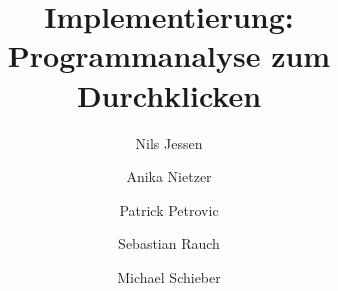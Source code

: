 \documentclass[parskip=full,11pt]{scrartcl}
\begin{document}
	\title{Implementierung: Programmanalyse zum Durchklicken}
	\author{Nils Jessen \and Anika Nietzer \and Patrick Petrovic \and Sebastian Rauch \and Michael Schieber}
	
	\maketitle

    
	
	
	
	
\end{document}
